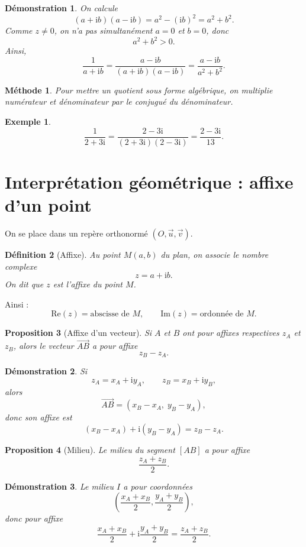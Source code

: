 \documentclass[11pt,a4paper]{article}
\newtheorem{definition}{Définition}[section]
\newtheorem{proposition}[definition]{Proposition}
\newtheorem{exemple}[definition]{Exemple}
\newtheorem*{demonstration}{Démonstration}
\newtheorem*{methode}{Méthode}
\newcommand{\ii}{\mathrm{i}}
\newcommand{\Ree}{\mathrm{Re}}
\newcommand{\Imm}{\mathrm{Im}}
\begin{document}
\begin{demonstration}
On calcule
\[
(a+\ii b)(a-\ii b)=a^2-(\ii b)^2=a^2+b^2.
\]
Comme $z\neq 0$, on n'a pas simultanément $a=0$ et $b=0$, donc
\[
a^2+b^2>0.
\]
Ainsi,
\[
\frac{1}{a+\ii b}
=\frac{a-\ii b}{(a+\ii b)(a-\ii b)}
=\frac{a-\ii b}{a^2+b^2}.
\]
\end{demonstration}

\begin{methode}
Pour mettre un quotient sous forme algébrique, on multiplie numérateur et dénominateur par le \emph{conjugué du dénominateur}.
\end{methode}

\begin{exemple}
\[
\frac{1}{2+3\ii}
=\frac{2-3\ii}{(2+3\ii)(2-3\ii)}
=\frac{2-3\ii}{13}.
\]
\end{exemple}

\section{Interprétation géométrique : affixe d'un point}

On se place dans un repère orthonormé $(O,\vec{u},\vec{v})$.

\begin{definition}[Affixe]
Au point $M(a,b)$ du plan, on associe le nombre complexe
\[
z=a+\ii b.
\]
On dit que $z$ est l'\emph{affixe} du point $M$.
\end{definition}

Ainsi :
\[
\Ree(z)=\text{abscisse de }M,
\qquad
\Imm(z)=\text{ordonnée de }M.
\]

\begin{proposition}[Affixe d'un vecteur]
Si $A$ et $B$ ont pour affixes respectives $z_A$ et $z_B$, alors le vecteur $\overrightarrow{AB}$ a pour affixe
\[
z_B-z_A.
\]
\end{proposition}

\begin{demonstration}
Si
\[
z_A=x_A+\ii y_A,\qquad z_B=x_B+\ii y_B,
\]
alors
\[
\overrightarrow{AB}=(x_B-x_A,\;y_B-y_A),
\]
donc son affixe est
\[
(x_B-x_A)+\ii(y_B-y_A)=z_B-z_A.
\]
\end{demonstration}

\begin{proposition}[Milieu]
Le milieu du segment $[AB]$ a pour affixe
\[
\frac{z_A+z_B}{2}.
\]
\end{proposition}

\begin{demonstration}
Le milieu $I$ a pour coordonnées
\[
\left(\frac{x_A+x_B}{2},\frac{y_A+y_B}{2}\right),
\]
donc pour affixe
\[
\frac{x_A+x_B}{2}+\ii\frac{y_A+y_B}{2}
=\frac{z_A+z_B}{2}.
\]
\end{demonstration}
\end{document}
